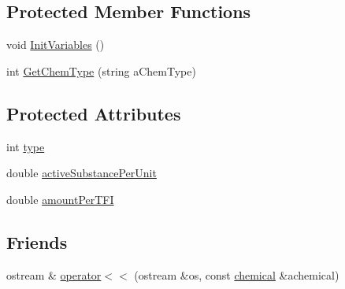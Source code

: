 \subsection*{Protected Member Functions}
\begin{DoxyCompactItemize}
\item 
void \hyperlink{classchemical_a8bb531b70e8d9c2270b2f9464d22069a}{InitVariables} ()
\item 
int \hyperlink{classchemical_a15170334ac60dc36dc9d94c6463f3874}{GetChemType} (string aChemType)
\end{DoxyCompactItemize}
\subsection*{Protected Attributes}
\begin{DoxyCompactItemize}
\item 
int \hyperlink{classchemical_a01dc27d1131089e1bd40e712f2db707c}{type}
\item 
double \hyperlink{classchemical_ade159c0dbe449923483c0f6c764d2a92}{activeSubstancePerUnit}
\item 
double \hyperlink{classchemical_a6bbe39833c0a3e01b8db20353213ebfd}{amountPerTFI}
\end{DoxyCompactItemize}
\subsection*{Friends}
\begin{DoxyCompactItemize}
\item 
ostream \& \hyperlink{classchemical_aa56b071bc2d38852ba56f7b6c9e10b81}{operator$<$$<$} (ostream \&os, const \hyperlink{classchemical}{chemical} \&achemical)
\end{DoxyCompactItemize}


